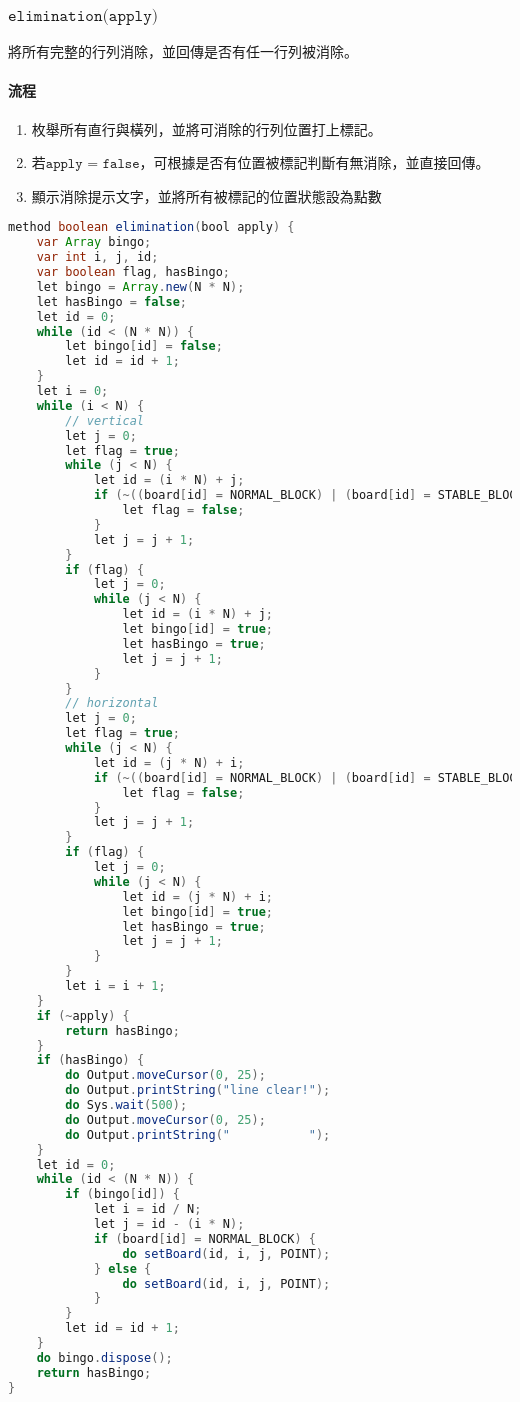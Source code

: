 \documentclass[pstricks, 12pt, a4paper]{article}
\begin{document}
    \subsubsection{$\texttt{elimination(apply)}$}
      將所有完整的行列消除，並回傳是否有任一行列被消除。
      \paragraph{流程}
      \begin{enumerate}
        \item 枚舉所有直行與橫列，並將可消除的行列位置打上標記。
        \item 若$\texttt{apply = false}$，可根據是否有位置被標記判斷有無消除，並直接回傳。
        \item 顯示消除提示文字，並將所有被標記的位置狀態設為點數
      \end{enumerate}
      \begin{lstlisting}[language=Java, frame=single]
method boolean elimination(bool apply) {
    var Array bingo;
    var int i, j, id;
    var boolean flag, hasBingo;
    let bingo = Array.new(N * N);
    let hasBingo = false;
    let id = 0;
    while (id < (N * N)) {
        let bingo[id] = false;
        let id = id + 1;
    }
    let i = 0;
    while (i < N) {
        // vertical
        let j = 0;
        let flag = true;
        while (j < N) {
            let id = (i * N) + j;
            if (~((board[id] = NORMAL_BLOCK) | (board[id] = STABLE_BLOCK))) {
                let flag = false;
            }
            let j = j + 1;
        }
        if (flag) {
            let j = 0;
            while (j < N) {
                let id = (i * N) + j;
                let bingo[id] = true;
                let hasBingo = true;
                let j = j + 1;
            }
        }
        // horizontal
        let j = 0;
        let flag = true;
        while (j < N) {
            let id = (j * N) + i;
            if (~((board[id] = NORMAL_BLOCK) | (board[id] = STABLE_BLOCK))) {
                let flag = false;
            }
            let j = j + 1;
        }
        if (flag) {
            let j = 0;
            while (j < N) {
                let id = (j * N) + i;
                let bingo[id] = true;
                let hasBingo = true;
                let j = j + 1;
            }
        }
        let i = i + 1;
    }
    if (~apply) {
        return hasBingo;
    }
    if (hasBingo) {
        do Output.moveCursor(0, 25);
        do Output.printString("line clear!");
        do Sys.wait(500);
        do Output.moveCursor(0, 25);
        do Output.printString("           ");
    }
    let id = 0;
    while (id < (N * N)) {
        if (bingo[id]) {
            let i = id / N;
            let j = id - (i * N);
            if (board[id] = NORMAL_BLOCK) {
                do setBoard(id, i, j, POINT);
            } else {
                do setBoard(id, i, j, POINT);
            }
        }
        let id = id + 1;
    }
    do bingo.dispose();
    return hasBingo;
}
      \end{lstlisting}
\end{document}

